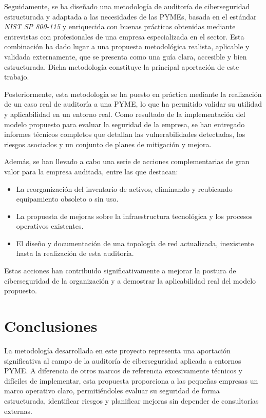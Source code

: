 \documentclass[a4paper, 11pt]{article}
\begin{document}
Seguidamente, se ha diseñado una metodología de auditoría de ciberseguridad estructurada y adaptada a las necesidades de las PYMEs, basada en el estándar \textit{NIST SP 800-115} y enriquecida con buenas prácticas obtenidas mediante entrevistas con profesionales de una empresa especializada en el sector. Esta combinación ha dado lugar a una propuesta metodológica realista, aplicable y validada externamente, que se presenta como una guía clara, accesible y bien estructurada. Dicha metodología constituye la principal aportación de este trabajo.

Posteriormente, esta metodología se ha puesto en práctica mediante la realización de un caso real de auditoría a una PYME, lo que ha permitido validar su utilidad y aplicabilidad en un entorno real. Como resultado de la implementación del modelo propuesto para evaluar la seguridad de la empresa, se han entregado informes técnicos completos que detallan las vulnerabilidades detectadas, los riesgos asociados y un conjunto de planes de mitigación y mejora.

Además, se han llevado a cabo una serie de acciones complementarias de gran valor para la empresa auditada, entre las que destacan:
\begin{itemize}
    \item La reorganización del inventario de activos, eliminando y reubicando equipamiento obsoleto o sin uso.
    \item La propuesta de mejoras sobre la infraestructura tecnológica y los procesos operativos existentes.
    \item El diseño y documentación de una topología de red actualizada, inexistente hasta la realización de esta auditoría.
\end{itemize}

Estas acciones han contribuido significativamente a mejorar la postura de ciberseguridad de la organización y a demostrar la aplicabilidad real del modelo propuesto.



\clearpage
\thispagestyle{nohead}

\section{Conclusiones}

La metodología desarrollada en este proyecto representa una aportación significativa al campo de la auditoría de ciberseguridad aplicada a entornos PYME. A diferencia de otros marcos de referencia excesivamente técnicos y difíciles de implementar, esta propuesta proporciona a las pequeñas empresas un marco operativo claro, permitiéndoles evaluar su seguridad de forma estructurada, identificar riesgos y planificar mejoras sin depender de consultorías externas.
\end{document}
